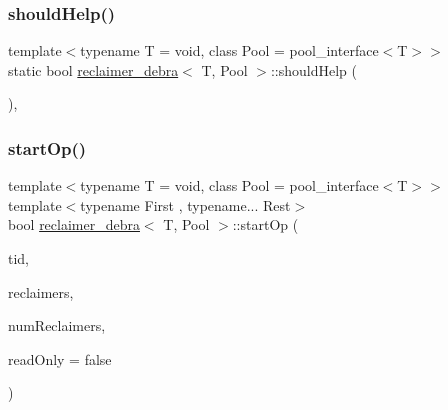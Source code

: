 \mbox{\label{classreclaimer__debra_aa525ada55c6d16c4e0134e48094d3ec6}} 
\subsubsection{\texorpdfstring{should\+Help()}{shouldHelp()}}
{\footnotesize\ttfamily template$<$typename T  = void, class Pool  = pool\+\_\+interface$<$\+T$>$$>$ \\
static bool \hyperlink{classreclaimer__debra}{reclaimer\+\_\+debra}$<$ T, Pool $>$\+::should\+Help (\begin{DoxyParamCaption}{ }\end{DoxyParamCaption})\hspace{0.3cm}{\ttfamily [inline]}, {\ttfamily [static]}}

\mbox{\label{classreclaimer__debra_a354ecd5812c2521c68b82cb59b2529a5}} 
\subsubsection{\texorpdfstring{start\+Op()}{startOp()}}
{\footnotesize\ttfamily template$<$typename T  = void, class Pool  = pool\+\_\+interface$<$\+T$>$$>$ \\
template$<$typename First , typename... Rest$>$ \\
bool \hyperlink{classreclaimer__debra}{reclaimer\+\_\+debra}$<$ T, Pool $>$\+::start\+Op (\begin{DoxyParamCaption}\item[{const int}]{tid,  }\item[{void $\ast$const $\ast$const}]{reclaimers,  }\item[{const int}]{num\+Reclaimers,  }\item[{const bool}]{read\+Only = {\ttfamily false} }\end{DoxyParamCaption})\hspace{0.3cm}{\ttfamily [inline]}}

\mbox{\label{classreclaimer__debra_a8dd097decc268366c947354231fac75d}} 
